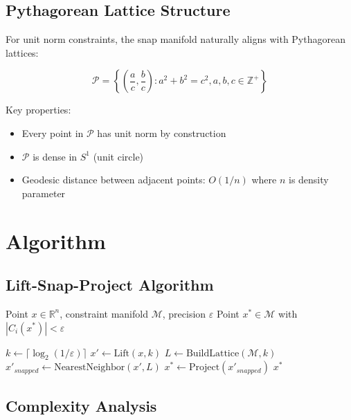 \documentclass{article}
\begin{document}
\subsection{Pythagorean Lattice Structure}

For unit norm constraints, the snap manifold naturally aligns with Pythagorean lattices:

\begin{equation}
\mathcal{P} = \left\{ \left(\frac{a}{c}, \frac{b}{c}\right) : a^2 + b^2 = c^2, a,b,c \in \mathbb{Z}^+ \right\}
\end{equation}

Key properties:
\begin{itemize}
    \item Every point in $\mathcal{P}$ has unit norm by construction
    \item $\mathcal{P}$ is dense in $S^1$ (unit circle)
    \item Geodesic distance between adjacent points: $O(1/n)$ where $n$ is density parameter
\end{itemize}

\section{Algorithm}

\subsection{Lift-Snap-Project Algorithm}

\begin{algorithm}
\caption{Hidden Dimension Encoding}
\begin{algorithmic}[1]
\REQUIRE Point $x \in \mathbb{R}^n$, constraint manifold $\mathcal{M}$, precision $\varepsilon$
\ENSURE Point $x^* \in \mathcal{M}$ with $|C_i(x^*)| < \varepsilon$

\STATE $k \leftarrow \lceil \log_2(1/\varepsilon) \rceil$
\STATE $x' \leftarrow \text{Lift}(x, k)$ 
\STATE $L \leftarrow \text{BuildLattice}(\mathcal{M}, k)$ 
\STATE $x'_{snapped} \leftarrow \text{NearestNeighbor}(x', L)$ 
\STATE $x^* \leftarrow \text{Project}(x'_{snapped})$ 
\RETURN $x^*$
\end{algorithmic}
\end{algorithm}

\subsection{Complexity Analysis}
\end{document}
